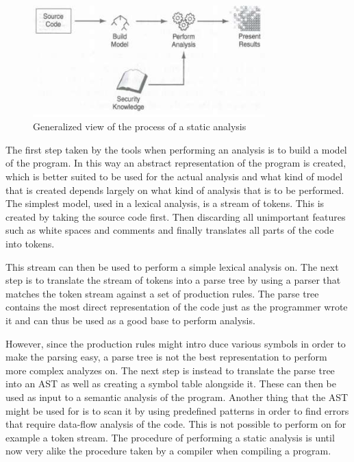 \clearpage

\begin{figure}[!htbp]
    \centering
    \includegraphics[width=0.8\textwidth]{Imgs/st_analyse.png}
    \caption{\label{fig:st_analyse} Generalized view of the process of a static analysis}
\end{figure}


The first step taken by the tools when performing an analysis is to build a model of the program. In this way an abstract representation of the program is created, which is better suited to be used for the actual analysis and what kind of model that is created depends largely on what kind of analysis that is to be performed. The simplest model, used in a lexical analysis, is a stream of tokens. This is created by taking the source code first. Then discarding all unimportant features such as white spaces and comments and finally translates all parts of the code into tokens.

This stream can then be used to perform a simple lexical analysis on. The next step is to translate the stream of tokens into a parse tree by using a parser that matches the token stream against a set of production rules. The parse tree contains the most direct representation of the code just as the programmer wrote it and can thus be used as a good base to perform analysis.

However, since the production rules might intro duce various symbols in order to make the parsing easy, a parse tree is not the best representation to perform more complex analyzes on. The next step is instead to translate the parse tree into an AST as well as creating a symbol table alongside it. These can then be used as input to a semantic analysis of the program. Another thing that the AST might be used for is to scan it by using predefined patterns in order to find errors that require data-flow analysis of the code. This is not possible to perform on for example a token stream. The procedure of performing a static analysis is until now very alike the procedure taken by a compiler when compiling a program.

